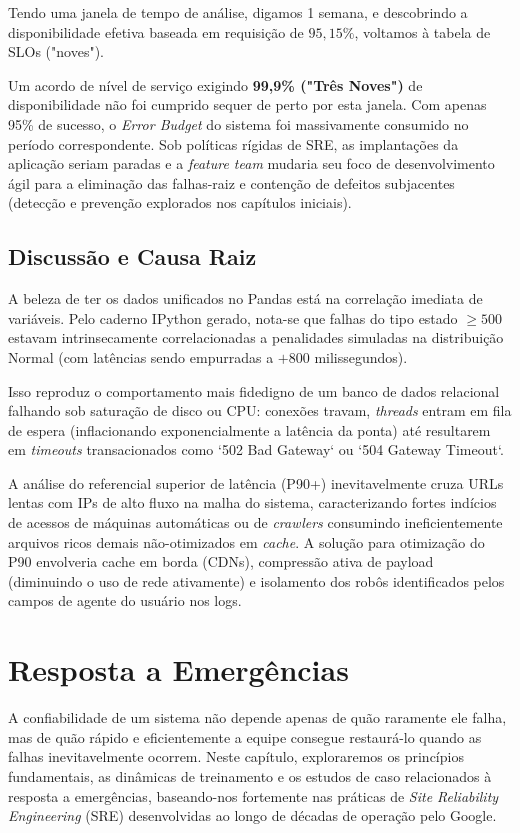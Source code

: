 \documentclass[12pt,a4paper]{report}
\begin{document}
Tendo uma janela de tempo de análise, digamos 1 semana, e descobrindo a disponibilidade efetiva baseada em requisição de $95,15\%$, voltamos à tabela de SLOs ("noves").

Um acordo de nível de serviço exigindo \textbf{99,9\% ("Três Noves")} de disponibilidade não foi cumprido sequer de perto por esta janela. Com apenas 95\% de sucesso, o \textit{Error Budget} do sistema foi massivamente consumido no período correspondente. Sob políticas rígidas de SRE, as implantações da aplicação seriam paradas e a \textit{feature team} mudaria seu foco de desenvolvimento ágil para a eliminação das falhas-raiz e contenção de defeitos subjacentes (detecção e prevenção explorados nos capítulos iniciais).

\section{Discussão e Causa Raiz}

A beleza de ter os dados unificados no Pandas está na correlação imediata de variáveis. Pelo caderno IPython gerado, nota-se que falhas do tipo estado $\geq 500$ estavam intrinsecamente correlacionadas a penalidades simuladas na distribuição Normal (com latências sendo empurradas a $+800$ milissegundos).

Isso reproduz o comportamento mais fidedigno de um banco de dados relacional falhando sob saturação de disco ou CPU: conexões travam, \textit{threads} entram em fila de espera (inflacionando exponencialmente a latência da ponta) até resultarem em \textit{timeouts} transacionados como `502 Bad Gateway` ou `504 Gateway Timeout`.

A análise do referencial superior de latência (P90+) inevitavelmente cruza URLs lentas com IPs de alto fluxo na malha do sistema, caracterizando fortes indícios de acessos de máquinas automáticas ou de \textit{crawlers} consumindo ineficientemente arquivos ricos demais não-otimizados em \textit{cache}. A solução para otimização do P90 envolveria cache em borda (CDNs), compressão ativa de payload (diminuindo o uso de rede ativamente) e isolamento dos robôs identificados pelos campos de agente do usuário nos logs.

\chapter{Resposta a Emergências}

A confiabilidade de um sistema não depende apenas de quão raramente ele falha, mas de quão rápido e eficientemente a equipe consegue restaurá-lo quando as falhas inevitavelmente ocorrem. Neste capítulo, exploraremos os princípios fundamentais, as dinâmicas de treinamento e os estudos de caso relacionados à resposta a emergências, baseando-nos fortemente nas práticas de \textit{Site Reliability Engineering} (SRE) desenvolvidas ao longo de décadas de operação pelo Google.
\end{document}
